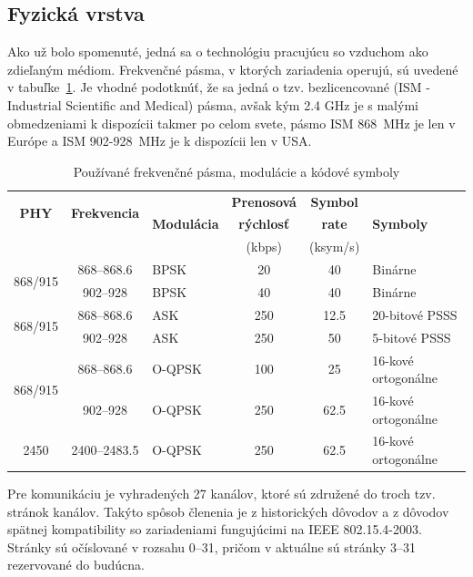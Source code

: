 \subsection{Fyzická vrstva}
\indent\indent Ako už bolo spomenuté, jedná sa o technológiu pracujúcu so vzduchom ako zdieľaným médiom. Frekvenčné pásma, v ktorých zariadenia operujú, sú uvedené v tabuľke~\ref{tab:frequencies}. Je vhodné podotknúť, že sa jedná o tzv. bezlicencované (ISM - Industrial Scientific and Medical) pásma, avšak kým 2.4 GHz je s malými obmedzeniami k dispozícii takmer po celom svete, pásmo ISM 868~MHz je len v Európe a ISM 902-928~MHz je k dispozícii len v USA.\\
\begin{table}[htbp]
\begin{center}
\begin{tabular}{|c|c|l|c|c|l|}
  \hline
  \multirow{2}{*}{\textbf{PHY}} & \multirow{2}{*}{\textbf{Frekvencia}} & \multirow{3}{*}{\textbf{Modulácia}} & \textbf{Prenosová} & \textbf{Symbol} & \multirow{3}{*}{\textbf{Symboly}} \\ 
  \multirow{2}{*}{(MHz)} & \multirow{2}{*}{(MHz)} & & \textbf{rýchlosť} & \textbf{rate} & \\ 
  & & & (kbps) & (ksym/s) & \\ [0.5ex]
  \hline\hline
  \multirow{2}{*}{868/915} & 868--868.6 & BPSK & 20 & 40 & Binárne\\
  & 902--928 & BPSK & 40 & 40 & Binárne\\ [0.5ex]
  \hline
  \multirow{2}{*}{868/915} & 868--868.6 & ASK & 250 & 12.5 & 20-bitové PSSS\\
  & 902--928 & ASK & 250 & 50 & 5-bitové PSSS\\ [0.5ex]
  \hline
  \multirow{2}{*}{868/915} & 868--868.6 & O-QPSK & 100 & 25 & 16-kové ortogonálne\\
  & 902--928 & O-QPSK & 250 & 62.5 & 16-kové ortogonálne\\ [0.5ex]
  \hline
  2450 & 2400--2483.5 & O-QPSK & 250 & 62.5 & 16-kové ortogonálne\\ [0.5ex]
  \hline
\end{tabular}
\caption{Používané frekvenčné pásma, modulácie a kódové symboly}
\label{tab:frequencies}
\end{center}
\end{table}
\indent\indent Pre komunikáciu je vyhradených 27 kanálov, ktoré sú združené do troch tzv. stránok kanálov. Takýto spôsob členenia je z historických dôvodov a z dôvodov spätnej kompatibility so zariadeniami fungujúcimi na IEEE 802.15.4-2003. Stránky sú očíslované v rozsahu 0--31, pričom v aktuálne sú stránky 3--31 rezervované do budúcna.\\ 

